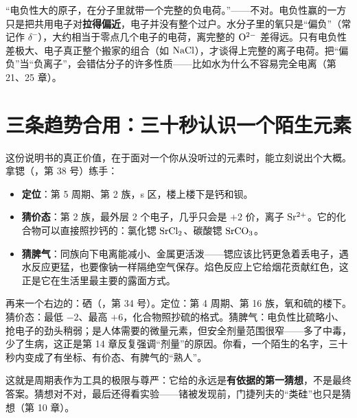 \begin{wuqu}
“电负性大的原子，在分子里就带一个完整的负电荷。”——不对。电负性赢的一方只是把共用电子对\textbf{拉得偏近}，电子并没有整个过户。水分子里的氧只是“偏负”（常记作 $\delta^-$），大约相当于零点几个电子的电荷，离完整的 $\mathrm{O^{2-}}$ 差得远。只有电负性差极大、电子真正整个搬家的组合（如 $\mathrm{NaCl}$），才谈得上完整的离子电荷。把“偏负”当“负离子”，会错估分子的许多性质——比如水为什么不容易完全电离（第 21、25 章）。
\end{wuqu}

\section{三条趋势合用：三十秒认识一个陌生元素}

这份说明书的真正价值，在于面对一个你从没听过的元素时，能立刻说出个大概。拿锶（，第 38 号）练手：

\begin{itemize}[itemsep=2pt]
\item \textbf{定位}：第 5 周期、第 2 族，s 区，楼上楼下是钙和钡。
\item \textbf{猜价态}：第 2 族，最外层 2 个电子，几乎只会是 $+2$ 价，离子 $\mathrm{Sr^{2+}}$。它的化合物可以直接照抄钙的：氯化锶 $\mathrm{SrCl_2}$、碳酸锶 $\mathrm{SrCO_3}$。
\item \textbf{猜脾气}：同族向下电离能减小、金属更活泼——锶应该比钙更急着丢电子，遇水反应更猛，也要像钠一样隔绝空气保存。焰色反应上它给烟花贡献红色，这正是它在生活里最主要的露面方式。
\end{itemize}

再来一个右边的：硒（，第 34 号）。定位：第 4 周期、第 16 族，氧和硫的楼下。猜价态：最低 $-2$、最高 $+6$，化合物照抄硫的格式。猜脾气：电负性比硫略小、抢电子的劲头稍弱；是人体需要的微量元素，但安全剂量范围很窄——多了中毒，少了生病，这正是第 14 章反复强调“剂量”的原因。你看，一个陌生的名字，三十秒内变成了有坐标、有价态、有脾气的“熟人”。

这就是周期表作为工具的极限与尊严：它给的永远是\textbf{有依据的第一猜想}，不是最终答案。猜想对不对，最后还得看实验——锗被发现前，门捷列夫的“类硅”也只是猜想（第 10 章）。

